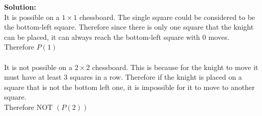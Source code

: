 \documentclass[11pt]{article}
\newcommand{\Not}{\mbox{NOT }}
\begin{document}
\begin{enumerate}
\begin{enumerate}
\begin{solution}
{\bf Solution:}\\
It is possible on a $1\times1$ chessboard. The single square could be considered to be the bottom-left square. Therefore since there is only one square that the knight can be placed, it can always reach the bottom-left square with 0 moves.\\
Therefore $P(1)$\\\\
It is not possible on a $2\times2$ chessboard. This is because for the knight to move it must have at least 3 squares in a row. Therefore if the knight is placed on a square that is not the bottom left one, it is impossible for it to move to another square. \\
Therefore $\Not(P(2))$
\end{solution}
\end{enumerate}
\end{enumerate}
\end{document}
